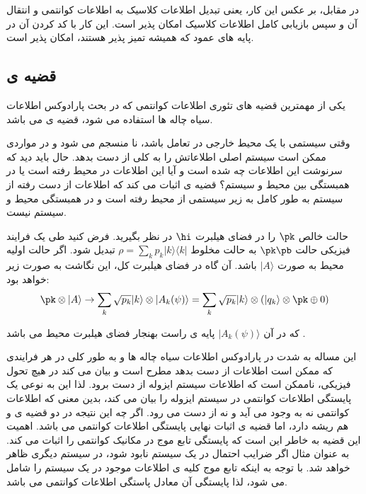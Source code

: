 در مقابل، بر عکس این کار، یعنی تبدیل اطلاعات کلاسیک به اطلاعات کوانتمی و انتقال آن و سپس بازیابی کامل اطلاعات کلاسیک امکان پذیر است. این کار با کد کردن آن در پایه های عمود که همیشه تمیز پذیر هستند، امکان پذیر است.


\subsection{قضیه ی }

یکی از مهمترین قضیه های تئوری اطلاعات کوانتمی که در بحث پارادوکس اطلاعات سیاه چاله ها استفاده می شود، قضیه ی 
می باشد.

وقتی سیستمی با یک محیط خارجی در تعامل باشد، نا منسجم 
می شود و در مواردی ممکن است سیستم اصلی اطلاعاتش را به کلی از دست بدهد. حال باید دید که سرنوشت این اطلاعات چه شده است و آیا این اطلاعات در محیط رفته است یا در همبستگی بین محیط و سیستم؟ قضیه ی  
اثبات می کند که اطلاعات از دست رفته از سیستم به طور کامل به زیر سیستمی از محیط رفته است و در همبستگی محیط و سیستم نیست.

حالت خالص 
$\pk$
را در فضای هیلبرت
$\hi$
در نظر بگیرید. فرض کنید  طی یک فرایند فیزیکی حالت
$\pk \pb$
به حالت مخلوط
$\rho = \sum_k p_k |k\rangle \langle k|$
تبدیل شود. اگر حالت اولیه محیط به صورت 
$|A\rangle$
باشد. آن گاه در فضای هیلبرت کل، این نگاشت به صورت زیر خواهد بود:
\begin{equation}
	\pk \otimes |A\rangle \rightarrow \sum_k \sqrt{p_k} |k\rangle \otimes |A_k(\psi)\rangle = \sum_k \sqrt{p_k} |k\rangle \otimes (|q_k\rangle \otimes \pk \oplus 0)
\end{equation}

که در آن 
$|A_k(\psi)\rangle$
پایه ی راست بهنجار فضای هیلبرت محیط می باشد
\cite{nohidden}.


این مساله به شدت در پارادوکس اطلاعات سیاه چاله ها و به طور کلی در هر فرایندی که  ممکن است اطلاعات از دست بدهد مطرح است و بیان می کند در هیچ تحول فیزیکی، ناممکن است که اطلاعات سیستم ایزوله از دست برود.  لذا  این به نوعی یک پایستگی اطلاعات کوانتمی در سیستم ایزوله را بیان می کند، بدین معنی که اطلاعات کوانتمی نه به وجود می آید و نه از دست می رود. اگر چه این نتیجه در دو قضیه ی 
و
هم ریشه دارد، اما قضیه ی 
اثبات نهایی پایستگی اطلاعات کوانتمی می باشد. اهمیت این قضیه به خاطر این است که پایستگی تابع موج در مکانیک کوانتمی را اثبات می کند. به عنوان مثال اگر ضرایب احتمال در یک سیستم نابود شود، در سیستم دیگری ظاهر خواهد شد. با توجه به اینکه تابع موج کلیه ی اطلاعات موجود در یک سیستم را شامل می شود، لذا پایستگی آن معادل پاستگی اطلاعات کوانتمی می باشد.
